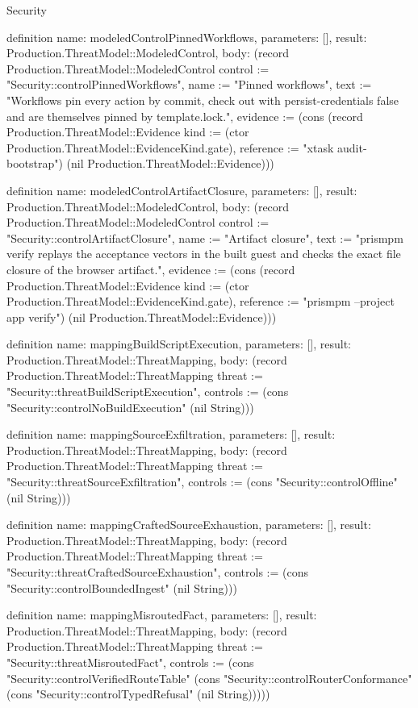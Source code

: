\begin{lexlean}{Security}
\begin{semanticmodule}
{definition{
  name: modeledControlPinnedWorkflows,
  parameters: [],
  result: Production.ThreatModel::ModeledControl,
  body: (record Production.ThreatModel::ModeledControl {control := "Security::controlPinnedWorkflows", name := "Pinned workflows", text := "Workflows pin every action by commit, check out with persist-credentials false and are themselves pinned by template.lock.", evidence := (cons (record Production.ThreatModel::Evidence {kind := (ctor Production.ThreatModel::EvidenceKind.gate), reference := "xtask audit-bootstrap"}) (nil Production.ThreatModel::Evidence))})
}

definition{
  name: modeledControlArtifactClosure,
  parameters: [],
  result: Production.ThreatModel::ModeledControl,
  body: (record Production.ThreatModel::ModeledControl {control := "Security::controlArtifactClosure", name := "Artifact closure", text := "prismpm verify replays the acceptance vectors in the built guest and checks the exact file closure of the browser artifact.", evidence := (cons (record Production.ThreatModel::Evidence {kind := (ctor Production.ThreatModel::EvidenceKind.gate), reference := "prismpm --project app verify"}) (nil Production.ThreatModel::Evidence))})
}

definition{
  name: mappingBuildScriptExecution,
  parameters: [],
  result: Production.ThreatModel::ThreatMapping,
  body: (record Production.ThreatModel::ThreatMapping {threat := "Security::threatBuildScriptExecution", controls := (cons "Security::controlNoBuildExecution" (nil String))})
}

definition{
  name: mappingSourceExfiltration,
  parameters: [],
  result: Production.ThreatModel::ThreatMapping,
  body: (record Production.ThreatModel::ThreatMapping {threat := "Security::threatSourceExfiltration", controls := (cons "Security::controlOffline" (nil String))})
}

definition{
  name: mappingCraftedSourceExhaustion,
  parameters: [],
  result: Production.ThreatModel::ThreatMapping,
  body: (record Production.ThreatModel::ThreatMapping {threat := "Security::threatCraftedSourceExhaustion", controls := (cons "Security::controlBoundedIngest" (nil String))})
}

definition{
  name: mappingMisroutedFact,
  parameters: [],
  result: Production.ThreatModel::ThreatMapping,
  body: (record Production.ThreatModel::ThreatMapping {threat := "Security::threatMisroutedFact", controls := (cons "Security::controlVerifiedRouteTable" (cons "Security::controlRouterConformance" (cons "Security::controlTypedRefusal" (nil String))))})
}

}
\end{semanticmodule}
\end{lexlean}
